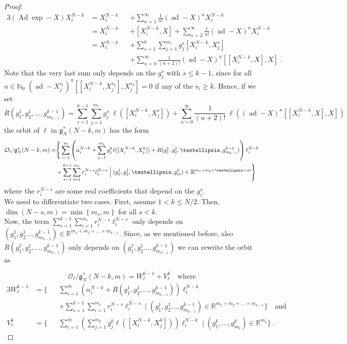 \documentclass[10pt,a4paper]{amsart}
\newcommand{\Adjoint}{\operatorname{Ad}}
\newcommand{\fancyg}{\mathfrak{g}}
\begin{document}
\begin{proof}
\begin{alignat*}{3}
			(\Adjoint \operatorname{exp} - X)X_i^{N-k} 
			& = X_i^{N-k} 
			& & + \sum_{n=1}^{\infty} \frac{1}{n!} (\operatorname{ad} -X)^n X_i^{N-k} \\
			& = X_i^{N-k} 
			& &+ [X_i^{N-k}, X] 
			+ \sum_{n=2}^{\infty} \frac{1}{n!} (\operatorname{ad} -X)^n X_i^{N-k} \\
			& = X_i^{N-k} 
			&& + \sum_{s=1}^{k} \sum_{j=1}^{m_s} g_j^s [X_i^{N-k}, X_j^s] \\
			&& & + \sum_{n=0}^{\infty} \frac{1}{(n+2)!} (\operatorname{ad} -X)^n [[X_i^{N-k}, X], X] \;.
		\end{alignat*}
		Note that the very last sum only depends on the $g_j^s$ with $s \leq k-1$, since for all $n \in \mathbb{N}_0$ $(\operatorname{ad}-X_j^{s_1})^n [[X_i^{N-k}, X_j^{s_2}], X_j^{s_3}] = 0$ if any of the $s_i \geq k$. Hence, if we set
		\begin{equation*}
			R(g_1^1,g_2^1, \ldots, g_{m_{k-1}}^{k-1}) = \sum_{s=1}^{k-1} \sum_{j=1}^{m_s} g_j^s \; \ell([X_i^{N-k}, X_j^s]) + \sum_{n=0}^{\infty} \frac{1}{(n+2)!}\; \ell\left((\operatorname{ad} -X)^n [[X_i^{N-k}, X], X]\right)
		\end{equation*}
		the orbit of $\ell$ in $\fancyg_N^*(N-k, m)$ has the form
		\begin{align}\label{eq: korbit}
			\mathcal{O}_{\ell} / \fancyg_N^*(N-k, m) = &\Bigg\{ 
			\sum_{i=1}^{m} \left(\alpha_i^{N-k} + \sum_{j=1}^{m_k} g_j^k \ell([X_i^{N-k}, X_j^k]) + R(g_1^1,g_2^1, \ldots, g_{m_{k-1}}^{k-1})\right) \ell_i^{N-k} \notag \\
			& + \sum_{s = 1}^{k-1} \sum_{i=1}^{m_s} r_i^{N-s} \ell_i^{N-s} \; \Big| \; (g_1^1,g_2^1, \ldots, g_{m}^k) \in \mathbb{R}^{m_1+m_2+\ldots + m} \Bigg\}
		\end{align}
		where the $r_i^{N-s}$ are some real coefficients that depend on the $g_i^s$.\\
		We need to differentiate two cases. First, assume $1<k\leq N/2$. Then,
		$\operatorname{dim}(N-s,m) = \min\left\{m_s,m\right\}$ for all $s< k$.\\
		Now, the term
		$\sum_{s = 1}^{k-1} \sum_{i=1}^{m_s} r_i^{N-s} \ell_i^{N-s}$ only depends on $(g_1^1,g_2^1 \ldots, g_{m_{k-1}}^{k-1}) \in \mathbb{R}^{m_1+m_2+\ldots + m_{k-1}}$.
		Since, as we mentioned before, also $R(g_1^1,g_2^1, \ldots, g_{m_{k-1}}^{k-1})$ only depends on $(g_1^1,g_2^1 \ldots, g_{m_{k-1}}^{k-1})$ we can rewrite the orbit as
		
		\[\mathcal{O}_{\ell} / \fancyg_N^*(N - k, m) = W_{\ell}^{k-1} + V_{\ell}^k \quad \text{where}\]
		\begin{alignat*}{3}
			W_{\ell}^{k-1} &=  \Bigg\{
			&& \sum_{i=1}^{m} \left(\alpha_i^{N-k}+ R(g_1^1,g_2^1, \ldots, g_{m_{k-1}}^{k-1})\right) \ell_i^{N-k}\\
			&&& + \sum_{s = 1}^{k-1} \sum_{i=1}^{m_s} r_i^{N-s} \ell_i^{N-s} \; \Big| \; (g_1^1,g_2^1 \ldots, g_{m_{k-1}}^{k-1}) \in \mathbb{R}^{m_1+m_2+\ldots + m_{k-1}} \Bigg\} \quad \text{and} \\
			V_{\ell}^k &= \Bigg\{ 
			&&\sum_{i=1}^{m} \left(\sum_{j=1}^{m_k} g_j^k \ell([X_i^{N-k}, X_j^k])\right) \ell_i^{N-k} \; \Big| \; (g_1^k, \ldots, g_{m_k}^k) \in \mathbb{R}^{m_k} \Bigg\} \;.
		\end{alignat*}
		

\end{proof}
\end{document}
